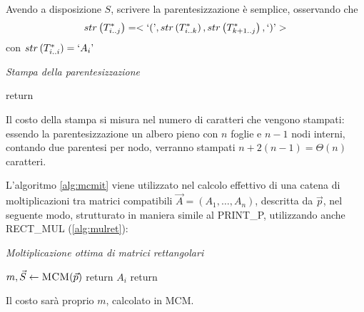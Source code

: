 Avendo a disposizione $S$, scrivere la parentesizzazione è semplice, osservando che
\begin{equation*}
    str\left( T_{i..j}^* \right) = < `(\textrm{'} , 
    str\left( T_{i..k}^* \right) ,
    str\left( T_{k+1..j}^* \right)
    , `)\textrm{'} > 
\end{equation*}
con $str\left( T_{i..i}^* \right) = `A_i\textrm{'} $ 
\begin{algorithm}[H]
\caption{\emph{Stampa della parentesizzazione}}\label{alg:mcmprint}
\begin{algorithmic}[1]
        \State {}
        \State return
    \EndIf
    \State {}
    \State {}
    \State {}
    \State {}
\EndProcedure
\end{algorithmic}
\end{algorithm}
Il costo della stampa si misura nel numero di caratteri che vengono stampati: essendo la parentesizzazione un albero pieno con $n$ foglie e $n-1$ nodi interni, contando due parentesi per nodo, verranno stampati $n+2(n-1) = \Theta(n)$ caratteri.

L'algoritmo \ref{alg:mcmit} viene utilizzato nel calcolo effettivo di una catena di moltiplicazioni tra matrici compatibili $\vec{A}=\left( A_1, \dots, A_n \right)$, descritta da $\vec{p}$, nel seguente modo, strutturato in maniera simile al PRINT\_P, utilizzando anche RECT\_MUL (\ref{alg:mulret}):
\begin{algorithm}[H]
\caption{\emph{Moltiplicazione ottima di matrici rettangolari}}\label{alg:mcmmul}
\begin{algorithmic}[1]
    \State $m, \vec{S} \gets \Call{MCM}{\vec{p}}$
        \State return $A_i$
    \EndIf
    \State {}
    \State {}
    \State return 
\EndProcedure
\end{algorithmic}
\end{algorithm}
Il costo sarà proprio $m$, calcolato in MCM.
